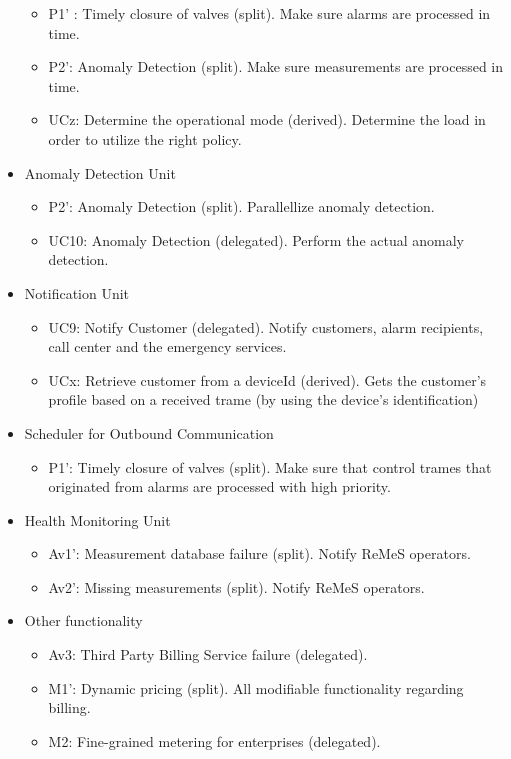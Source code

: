 \begin{itemize}
\begin{itemize}
		\item P1' : Timely closure of valves (split). Make sure alarms are processed
		in time. 
	  	\item P2': Anomaly Detection (split). Make sure measurements are processed
	  	in time. 
		\item UCz: Determine the operational mode (derived). Determine the load in
		order to utilize the right policy.
	\end{itemize}
	\item Anomaly Detection Unit
	\begin{itemize}
		\item P2': Anomaly Detection (split). Parallellize anomaly detection.
		\item UC10: Anomaly Detection (delegated). Perform the actual anomaly
		detection.
	\end{itemize}
	\item Notification Unit
	\begin{itemize}
		\item UC9: Notify Customer (delegated). Notify customers, alarm recipients,
		call center and the emergency services. 
	  	\item UCx: Retrieve customer from a deviceId (derived). Gets the customer's
	  	profile based on a received trame (by using the device's identification)
	\end{itemize}
	\item Scheduler for Outbound Communication
	\begin{itemize}
	  \item P1': Timely closure of valves (split). Make sure that control trames
	  that originated from alarms are processed with high priority. 
	\end{itemize}
	\item Health Monitoring Unit
	\begin{itemize}
		\item Av1': Measurement database failure (split). Notify ReMeS operators. 
		\item Av2': Missing measurements (split). Notify ReMeS operators.
	\end{itemize}
	\item Other functionality
	\begin{itemize}
	  	\item Av3: Third Party Billing Service failure (delegated).
	  	\item M1': Dynamic pricing (split). All modifiable functionality regarding
	  	billing.
	  	\item M2: Fine-grained metering for enterprises (delegated).

\end{itemize}
\end{itemize}
